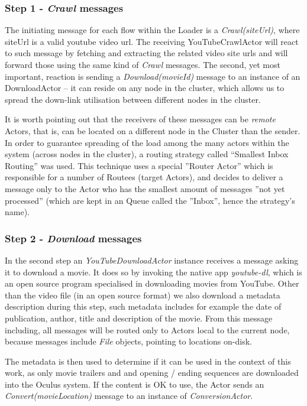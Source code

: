 \subsubsection{Step 1 - \textit{Crawl} messages}
The initiating message for each flow within the Loader is a \textit{Crawl(siteUrl)}, where siteUrl is a valid youtube video url.
The receiving YouTubeCrawlActor will react to such message by fetching and extracting the related video site urls and will forward those using the same kind of \textit{Crawl} messages. The second, yet most important, reaction is sending a \textit{Download(movieId)} message to an instance of an DownloadActor -- it  can reside on any node in the cluster, which allows us to spread the down-link utilisation between different nodes in the cluster.

It is worth pointing out that the receivers of these messages can be \textit{remote} Actors, that is, can be located on a different node in the Cluster than the sender. In order to guarantee spreading of the load among the many actors within the system (across nodes in the cluster), a routing strategy called ``Smallest Inbox Routing'' was used. This technique uses a special ''Router Actor'' which is responsible for a number of Routees (target Actors), and decides to deliver a message only to the Actor who has the smallest amount of messages ''not yet processed'' (which are kept in an Queue called the ''Inbox'', hence the strategy's name).

\subsubsection{Step 2 - \textit{Download} messages}
In the second step an \textit{YouTubeDownloadActor} instance receives a message asking it to download a movie.
It does so by invoking the native app \textit{youtube-dl}, which is an open source program specialised in downloading movies from YouTube.
Other than the video file (in an open source format) we also download a metadata description during this step, such metadata includes for example the date of publication, author, title and description of the movie. From this message including, all messages will be routed only to Actors local to the current node, because messages include \textit{File} objects, pointing to locations on-disk.

The metadata is then used to determine if it can be used in the context of this work, as only movie trailers and and opening / ending sequences are downloaded into the Oculus system. If the content is OK to use, the Actor sends an \textit{Convert(movieLocation)} message to an instance of \textit{ConversionActor}.

